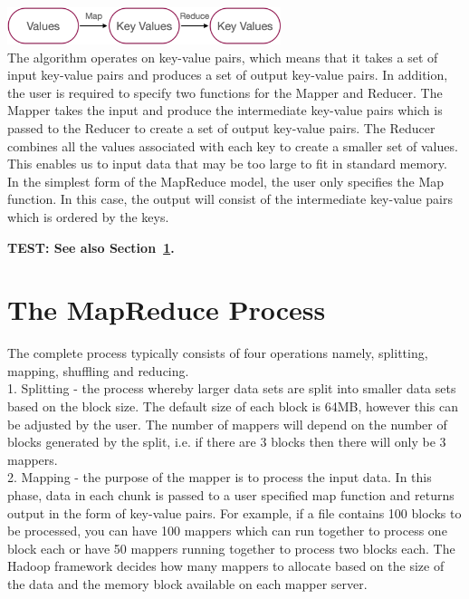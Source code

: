 \documentclass[11pt]{book}
\begin{document}
\includegraphics[width=8cm]{keyvalue} \\

The algorithm operates on key-value pairs, which means that it takes a set of input key-value pairs and produces a set of output key-value pairs. In addition, the user is required to specify two functions for the Mapper and Reducer. The Mapper takes the input and produce the intermediate key-value pairs which is passed to the Reducer to create a set of output key-value pairs. The Reducer combines all the values associated with each key to create a smaller set of values. This enables us to input data that may be too large to fit in standard memory.\\

In the simplest form of the MapReduce model, the user only specifies the Map function. In this case, the output will consist of the intermediate key-value pairs which is ordered by the keys. 

{\bf TEST: 
See also Section~\ref{sec:mapreduce}. }

\section{The MapReduce Process}
\label{sec:mapreduce}

The complete process typically consists of four operations namely, splitting, mapping, shuffling and reducing.\\

1. Splitting - the process whereby larger data sets are split into smaller data sets based on the block size. The default size of each block is 64MB, however this can be adjusted by the user. The number of mappers will depend on the number of blocks generated by the split, i.e. if there are 3 blocks then there will only be 3 mappers.\\

2. Mapping - the purpose of the mapper is to process the input data. In this phase, data in each chunk is passed to a user specified map function and returns output in the form of key-value pairs. For example, if a file contains 100 blocks to be processed, you can have 100 mappers which can run together to process one block each or have 50 mappers running together to process two blocks each. The Hadoop framework decides how many mappers to allocate based on the size of the data and the memory block available on each mapper server.\\
\end{document}
